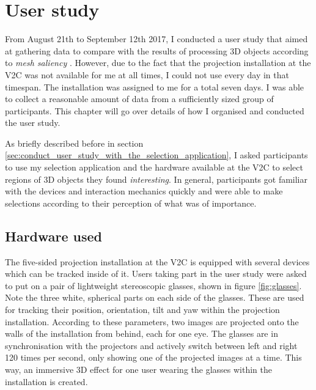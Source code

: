 \chapter{User study}
\label{sec:user_study_chapter}
%
%

From August 21th to September 12th 2017, I conducted a user study that aimed at gathering data to compare with the results of processing 3D objects according to \textit{mesh saliency} \cite{lee2005mesh}. However, due to the fact that the projection installation at the V2C was not available for me at all times, I could not use every day in that timespan. The installation was assigned to me for a total seven days. I was able to collect a reasonable amount of data from a sufficiently sized group of participants. This chapter will go over details of how I organised and conducted the user study.

As briefly described before in section \ref{sec:conduct_user_study_with_the_selection_application}, I asked participants to use my selection application and the hardware available at the V2C to select regions of 3D objects they found \textit{interesting}. In general, participants got familiar with the devices and interaction mechanics quickly and were able to make selections according to their perception of what was of importance.

\section{Hardware used}
\label{hardware_used}
%
%

The five-sided projection installation at the V2C is equipped with several devices which can be tracked inside of it. Users taking part in the user study were asked to put on a pair of lightweight stereoscopic glasses, shown in figure \ref{fig:glasses}. Note the three white, spherical parts on each side of the glasses. These are used for tracking their position, orientation, tilt and yaw within the projection installation. According to these parameters, two images are projected onto the walls of the installation from behind, each for one eye. The glasses are in synchronisation with the projectors and actively switch between left and right 120 times per second, only showing one of the projected images at a time. This way, an immersive 3D effect for one user wearing the glasses within the installation is created.  

